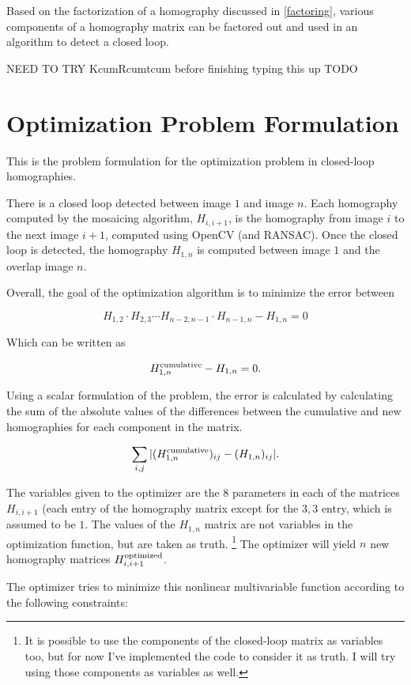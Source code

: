 \documentclass{article}
\begin{document}
Based on the factorization of a homography discussed in \ref{factoring},
various components of a homography matrix can be factored out and used in an
algorithm to detect a closed loop. 

NEED TO TRY KcumRcumtcum before finishing typing this up
TODO

\section{Optimization Problem Formulation}

This is the problem formulation for the optimization problem in closed-loop
homographies.

There is a closed loop detected between image $1$ and image $n$. Each
homography computed by the mosaicing algorithm, $H_{i, i + 1}$, is the
homography from image $i$ to the next image $i + 1$, computed using OpenCV (and
RANSAC). Once the closed loop is detected, the homography $H_{1, n}$ is
computed between image $1$ and the overlap image $n$. 

Overall, the goal of the optimization algorithm is to minimize the error
between
 
\[H_{1, 2} \cdot H_{2, 3} \cdots H_{n - 2, n - 1} \cdot H_{n - 1, n} - H_{1, n} = 0\]

Which can be written as

\[H_{1, n}^{\textnormal{cumulative}} - H_{1, n} = 0.\]

Using a scalar formulation of the problem, the error is calculated by
calculating the sum of the absolute values of the differences between the
cumulative and new homographies for each component in the matrix.

\[\sum_{i,j} |(H_{1, n}^{\textnormal{cumulative}})_{ij} - (H_{1, n})_{ij}|.\]

The variables given to the optimizer are the $8$ parameters in each of the
matrices $H_{i, i + 1}$ (each entry of the homography matrix except for the $3,
3$ entry, which is assumed to be $1$. The values of the $H_{1, n}$ matrix are
not variables in the optimization function, but are taken as truth.
\footnote{It is possible to use the components of the closed-loop matrix as
variables too, but for now I've implemented the code to consider it as truth. I
will try using those components as variables as well.} The optimizer will yield
$n$ new homography matrices $H_{i, i+1}^{\textnormal{optimized}}$. 

The optimizer tries to minimize this nonlinear multivariable function according
to the following constraints:
\end{document}
